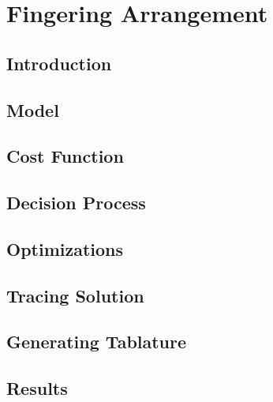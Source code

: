 \chapter{Fingering Arrangement}

\label{Chapter:Fingering-Arrangement}

\section{Introduction}
\section{Model}
\section{Cost Function}
\section{Decision Process}
\section{Optimizations}
\section{Tracing Solution}
\section{Generating Tablature}
\section{Results}
